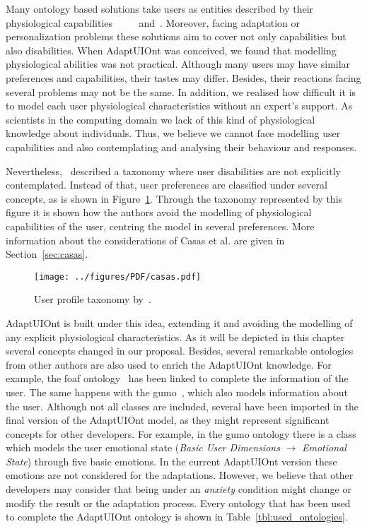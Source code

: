 Many ontology based solutions take users as entities described by their physiological
capabilities~\citep{gregor_designing_2002}~\citep{razmerita_ontology_based_2003}
\citep{pereira_triple_2005}~\citep{persad_characterising_2007}~\citep{persad_cognitive_2007}
and~\citep{skillen2012ontological}. Moreover, facing adaptation or personalization
problems these solutions aim to cover not only capabilities but also disabilities.
When AdaptUIOnt was conceived, we found that modelling physiological abilities
was not practical. Although many users may have similar preferences and capabilities,
their tastes may differ. Besides, their reactions facing several problems may not
be the same. In addition, we realised how difficult it is to model each user
physiological characteristics without an expert's support. As scientists in the
computing domain we lack of this kind of physiological knowledge about individuals.
Thus, we believe we cannot face modelling user capabilities and also contemplating
and analysing their behaviour and responses.

Nevertheless,~\citet{casas_user_2008} described a taxonomy where user disabilities
are not explicitly contemplated. Instead of that, user preferences are classified
under several concepts, as is shown in Figure~\ref{fig:casas}. Through the taxonomy
represented by this figure it is shown how the authors avoid the modelling of
physiological capabilities of the user, centring the model in several preferences.
More information about the considerations of Casas et al. are given in
Section~\ref{sec:casas}.


\begin{figure}
\centering
\texttt{[image: ../figures/PDF/casas.pdf]}
\caption{User profile taxonomy by~\citet{casas_user_2008}.}
\label{fig:casas}
\end{figure}

AdaptUIOnt is built under this idea, extending it and avoiding the modelling of
any explicit physiological characteristics. As it will be depicted in this chapter
several concepts changed in our proposal. Besides, several remarkable ontologies
from other authors are also used to enrich the AdaptUIOnt knowledge. For example,
the \ac{foaf} ontology~\citep{foaf} has been linked to complete the information 
of the user. The same happens with the \ac{gumo}~\citep{heckmann_gumogeneral_2005}, 
which also models information about the user. Although not all classes are 
included, several have been imported in the final version of the AdaptUIOnt 
model, as they might represent significant concepts for other developers. 
For example, in the \ac{gumo} ontology there is a class which models the user 
emotional state (\textit{Basic User Dimensions} $\rightarrow$ 
\textit{Emotional State}) through five basic emotions. In  the current AdaptUIOnt 
version these emotions are not considered for the adaptations. However, we believe
that other developers may consider that being under an \textit{anxiety} condition
might change or modify the result or the adaptation process. Every ontology that
has been used to complete the AdaptUIOnt ontology is shown in Table~\ref{tbl:used_ontologies}.

